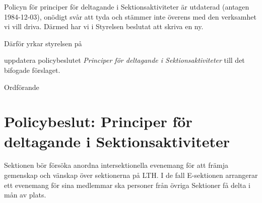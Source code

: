 \documentclass[../_main/handlingar.tex]{subfiles}
\begin{document}
Policyn för principer för deltagande i Sektionsaktiviteter är utdaterad (antagen 1984-12-03), onödigt svår att tyda och stämmer inte överens med den verksamhet vi vill driva. Därmed har vi i Styrelsen beslutat att skriva en ny.

Därför yrkar styrelsen på

\begin{attsatser}
    \att uppdatera policybeslutet \emph{Principer för deltagande i Sektionsaktiviteter} till det bifogade förslaget.
\end{attsatser}

\begin{signatures}{1}
    \ist
    \signature{\ordf}{Ordförande}
\end{signatures}

\newpage
\section*{Policybeslut: Principer för deltagande i Sektionsaktiviteter}
Sektionen bör försöka anordna intersektionella evenemang för att främja gemenskap och vänskap över sektionerna på LTH. I de fall E-sektionen arrangerar ett evenemang för sina medlemmar ska personer från övriga Sektioner få delta i mån av plats.
\end{document}
